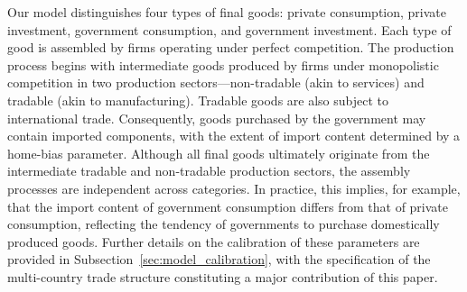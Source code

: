 \documentclass[a4paper,11pt]{article}
\numberwithin{equation}{section}
\begin{document}
Our model distinguishes four types of final goods: private consumption, private investment, government consumption, and government investment.
Each type of good is assembled by firms operating under perfect competition.
The production process begins with intermediate goods produced by firms under monopolistic competition in two production sectors---non-tradable (akin to services) and tradable (akin to manufacturing).
Tradable goods are also subject to international trade.
Consequently, goods purchased by the government may contain imported components, with the extent of import content determined by a home-bias parameter.
Although all final goods ultimately originate from the intermediate tradable and non-tradable production sectors, the assembly processes are independent across categories.
In practice, this implies, for example, that the import content of government consumption differs from that of private consumption, reflecting the tendency of governments to purchase domestically produced goods.
Further details on the calibration of these parameters are provided in Subsection~\ref{sec:model_calibration}, with the specification of the multi-country trade structure constituting a major contribution of this paper.
\end{document}
